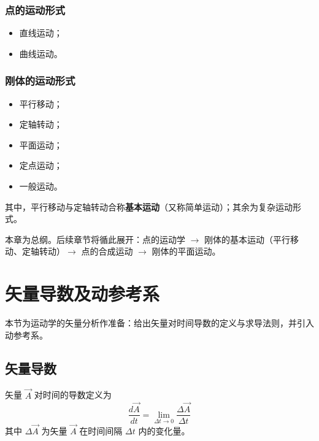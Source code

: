 \subsubsection{点的运动形式}

\begin{itemize}
    \item 直线运动；
    \item 曲线运动。
\end{itemize}

\subsubsection{刚体的运动形式}

\begin{itemize}
    \item 平行移动；
    \item 定轴转动；
    \item 平面运动；
    \item 定点运动；
    \item 一般运动。
\end{itemize}

其中，平行移动与定轴转动合称\textbf{基本运动}（又称简单运动）；其余为复杂运动形式。

\begin{tipbox}[后继章节]
本章为总纲。后续章节将循此展开：点的运动学 $\to$ 刚体的基本运动（平行移动、定轴转动）$\to$ 点的合成运动 $\to$ 刚体的平面运动。
\end{tipbox}

\section{矢量导数及动参考系}

本节为运动学的矢量分析作准备：给出矢量对时间导数的定义与求导法则，并引入动参考系。

\subsection{矢量导数}

矢量 $\vec{A}$ 对时间的导数定义为
\begin{equation}
    \frac{d\vec{A}}{dt}=\lim_{\Delta t\to 0}\frac{\Delta\vec{A}}{\Delta t}
    \label{eq:5-shiliang-daoshu-dingyi}
\end{equation}
其中 $\Delta\vec{A}$ 为矢量 $\vec{A}$ 在时间间隔 $\Delta t$ 内的变化量。


